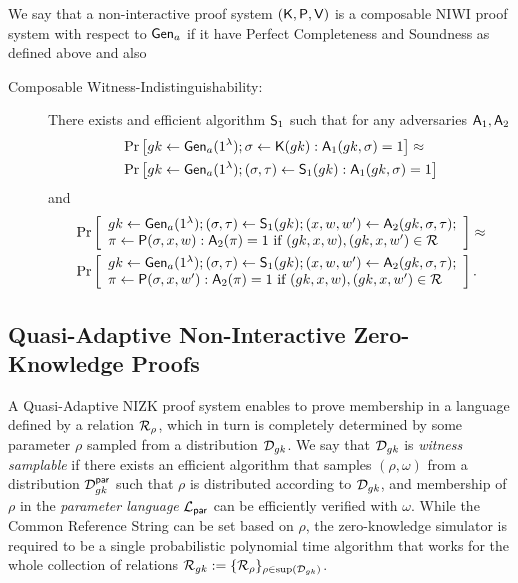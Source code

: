\begin{definition} We say that a non-interactive proof system $(\mathsf{K},\mathsf{P},\mathsf{V})$ is a composable NIWI proof system with respect to $\mathsf{Gen}_a$ if it have Perfect Completeness and Soundness as defined above and also
\begin{description}
\item[Composable Witness-Indistinguishability:] There exists and efficient algorithm $\mathsf{S}_1$ such that for any adversaries $\mathsf{A}_1,\mathsf{A}_2$
\begin{align*}
&\Pr\left[
gk\gets\mathsf{Gen}_a(1^\lambda);\sigma\gets\mathsf{K}(gk):
\mathsf{A}_1(gk,\sigma)=1
\right]\approx\\
&\Pr\left[
gk\gets\mathsf{Gen}_a(1^\lambda);(\sigma,\tau)\gets\mathsf{S}_1(gk):
\mathsf{A}_1(gk,\sigma)=1
\right]
\end{align*}
and
\begin{align*}
&\Pr\left[
\begin{array}{l}
gk\gets\mathsf{Gen}_a(1^\lambda);(\sigma,\tau)\gets\mathsf{S}_1(gk);(x,w,w')\gets\mathsf{A}_2(gk,\sigma,\tau);\\
\pi\gets\mathsf{P}(\sigma,x,w):\mathsf{A}_2(\pi)=1\text{ if }(gk,x,w),(gk,x,w')\in\mathcal{R}
\end{array}
\right]\approx\\
&\Pr\left[
\begin{array}{l}
gk\gets\mathsf{Gen}_a(1^\lambda);(\sigma,\tau)\gets\mathsf{S}_1(gk);(x,w,w')\gets\mathsf{A}_2(gk,\sigma,\tau);\\
\pi\gets\mathsf{P}(\sigma,x,w'):\mathsf{A}_2(\pi)=1\text{ if }(gk,x,w),(gk,x,w')\in\mathcal{R}
\end{array}
\right].
\end{align*}
\end{description}
\end{definition}

\subsection{Quasi-Adaptive Non-Interactive Zero-Knowledge Proofs}
A Quasi-Adaptive NIZK proof system \cite{AC:JutRoy13} enables
to prove membership in a language defined by a relation $\mathcal{R}_\rho$, which in turn is completely determined by some parameter
$\rho$ sampled from a distribution $\mathcal{D}_{gk}$.
We say that $\mathcal{D}_{gk}$ is \emph{witness samplable} if there exists an efficient
algorithm that samples $(\rho,\omega)$ from a distribution $\mathcal{D}_{gk}^{\mathsf{par}}$ such that $\rho$ is distributed according to $\mathcal{D}_{gk}$, and membership of $\rho$
in the \emph{parameter language} $\mathcal{L}_\mathsf{par}$ can be efficiently verified with $\omega$.
While the Common Reference String can be set based on $\rho$, the zero-knowledge simulator is required to be a single probabilistic polynomial time
algorithm that works for the whole collection of relations $\mathcal{R}_{gk}:=\{\mathcal{R}_\rho\}_{\rho \in \mathrm{sup}(\mathcal{D}_{gk})}$. 


